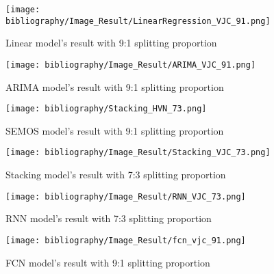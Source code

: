 \documentclass{ieeeojies}
\begin{document}
\begin{figure}[H]
  \centering
  \begin{minipage}{0.8\linewidth}
    \centering
    \texttt{[image: bibliography/Image\_Result/LinearRegression\_VJC\_91.png]}
    \caption{Linear model's result with 9:1 splitting proportion}
    \label{fig8}
  \end{minipage}
\end{figure}

\begin{figure}[H]
  \centering
  \begin{minipage}{0.8\linewidth}
    \centering
    \texttt{[image: bibliography/Image\_Result/ARIMA\_VJC\_91.png]}
    \caption{ARIMA model's result with 9:1 splitting proportion}
    \label{fig9}
  \end{minipage}
\end{figure}

\begin{figure}[H]
  \centering
  \begin{minipage}{0.8\linewidth}
    \centering
    \texttt{[image: bibliography/Stacking\_HVN\_73.png]}
    \caption{SEMOS model's result with 9:1 splitting proportion}
    \label{fig8}
  \end{minipage}
\end{figure}

\begin{figure}[H]
  \centering
  \begin{minipage}{0.8\linewidth}
    \centering
    \texttt{[image: bibliography/Image\_Result/Stacking\_VJC\_73.png]}
    \caption{Stacking model's result with 7:3 splitting proportion}
    \label{fig9}
  \end{minipage}
\end{figure}

\begin{figure}[H]
  \centering
  \begin{minipage}{0.8\linewidth}
    \centering
    \texttt{[image: bibliography/Image\_Result/RNN\_VJC\_73.png]}
    \caption{RNN model's result with 7:3 splitting proportion}
    \label{fig8}
  \end{minipage}
\end{figure}

\begin{figure}[H]
  \centering
  \begin{minipage}{0.8\linewidth}
    \centering
    \texttt{[image: bibliography/Image\_Result/fcn\_vjc\_91.png]}
    \caption{FCN model's result with 9:1 splitting proportion}
    \label{fig9}
  \end{minipage}
\end{figure}
\end{document}
